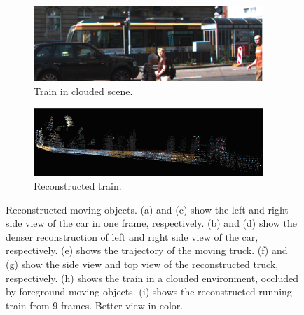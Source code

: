 \documentclass[10pt,twocolumn,letterpaper]{article}  %
\begin{document}
\begin{figure}[thpb]
	\begin{subfigure}{0.47\textwidth}
  	\centering
 	\includegraphics[width=0.95\textwidth]{image/trainBkg.eps}%
  	\caption{Train in clouded scene.}
  	\label{fig:trainImg}
	\end{subfigure}%
  	\begin{subfigure}{0.53\textwidth}
  	\centering
 	\includegraphics[width=0.95\textwidth]{image/trainSideBright.eps}%
  	\caption{Reconstructed train.}
  	\label{fig:train_top}
	\end{subfigure}%
  	\caption{Reconstructed moving objects. (a) and (c) show the left and right side view of the car in one frame, respectively. (b) and (d) show the denser reconstruction of left and right side view of the car, respectively. (e) shows the trajectory of the moving truck. (f) and (g) show the side view and top view of the reconstructed truck, respectively. (h) shows the train in a clouded environment, occluded by foreground moving objects. (i) shows the reconstructed running train from 9 frames. Better view in color.}
   \label{fig:movReconst}
   \vspace{-3mm}
\end{figure}

\end{document}
